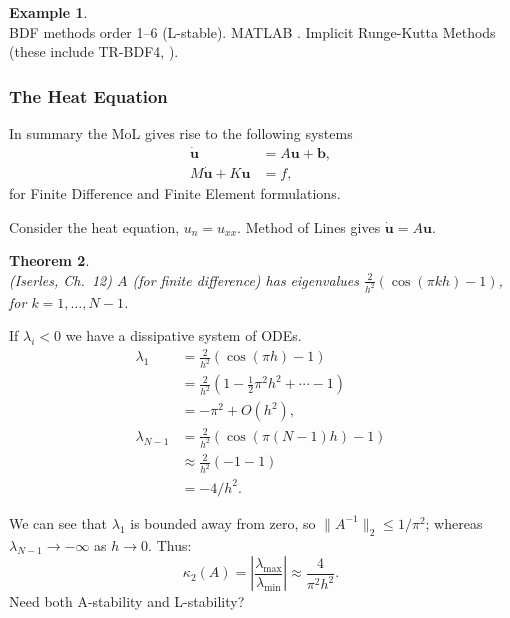 \documentclass[12pt, a4paper]{article}
\newtheorem{thm}{Theorem}[section]
\theoremstyle{definition}
\newtheorem{example}[thm]{Example}
\theoremstyle{remark}
\numberwithin{equation}{section}
\begin{document}
\begin{example} \ \\
BDF methods order 1--6 (L-stable). MATLAB .
Implicit Runge-Kutta Methods (these include TR-BDF4, ).
\end{example}

\newpage
\subsubsection{The Heat Equation}
In summary the MoL gives rise to the following systems
\begin{align*}
\mathbf{\dot u} &= A \mathbf{u} + \mathbf{b}, \\
M\mathbf{\dot u} + K\mathbf{u} &= f,
\end{align*}
for Finite Difference and Finite Element formulations.



Consider the heat equation, $u_n = u_{xx}$. Method of Lines gives
$\mathbf{\dot u} = A\mathbf{u}$.

\begin{thm} \ \\ (Iserles, Ch.~12) $A$ (for finite difference) has eigenvalues $\frac{2}{h^2} (\cos(\pi k h) - 1)$,
for $k = 1, \ldots, N-1$.
\end{thm}

If $\lambda_i < 0$ we have a dissipative system of ODEs.
\begin{align*}
\lambda_1 &= \tfrac{2}{h^2}\left( \cos(\pi h) - 1\right) \\
& = \tfrac{2}{h^2}(1 - \tfrac{1}{2}\pi^2 h^2 + \cdots - 1) \\
& = -\pi^2 + O(h^2), \\
\lambda_{N-1} &= \tfrac{2}{h^2} \left(\cos(\pi(N-1)h) - 1\right) \\
&\approx \tfrac{2}{h^2}(-1 -1) \\
&= -4/h^2.
\end{align*}

We can see that $\lambda_1$ is bounded away from zero, so $\|A^{-1}\|_2 \le 1/\pi^2$;
whereas $\lambda_{N-1} \rightarrow -\infty$ as $h\rightarrow 0$. Thus:
$$\kappa_2(A) = \left| \frac{\lambda_{\mathrm{max}}}{\lambda_{\mathrm{min}}} \right| 
\approx \frac{4}{\pi^2 h^2} .$$
Need both A-stability and L-stability?

\newpage
\end{document}
